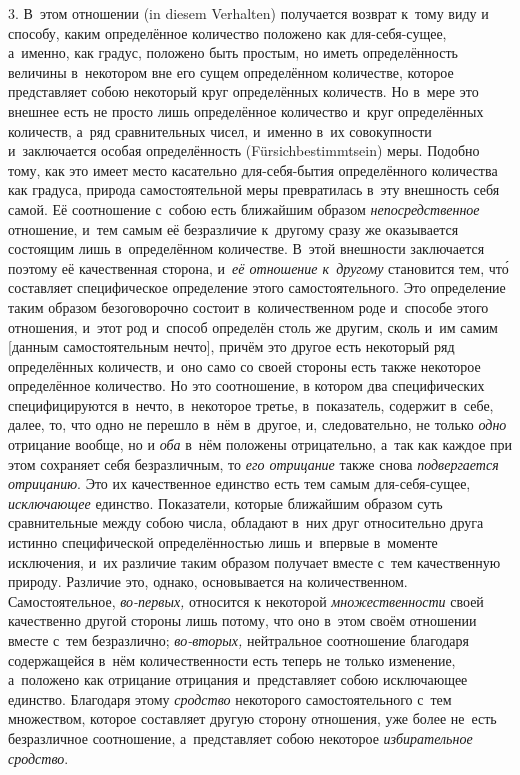3. В~этом отношении (in die\-sem Ver\-hal\-ten) получается возврат к~тому виду
и способу, каким определённое количество положено как для-себя-сущее, а~именно,
как градус, положено быть простым, но иметь определённость величины в~некотором
вне его сущем определённом количестве, которое представляет собою некоторый
круг определённых количеств. Но в~мере это внешнее есть не просто лишь
определённое количество и~круг определённых количеств, а~ряд сравнительных
чисел, и~именно в~их совокупности и~заключается особая определённость
(Für\-sich\-bes\-timmt\-sein) меры. Подобно тому, как это имеет место
касательно для-себя-бытия определённого количества как градуса, природа
самостоятельной меры превратилась в~эту внешность себя самой. Её соотношение
с~собою есть ближайшим образом {\em непосредственное} отношение, и~тем самым её
безразличие к~другому сразу же оказывается состоящим лишь в~определённом
количестве. В~этой внешности заключается поэтому её качественная сторона,
и~{\em её отношение к~другому} становится тем, чт\'{о} составляет специфическое
определение этого самостоятельного. Это определение таким образом безоговорочно
состоит в~количественном роде и~способе этого отношения, и~этот род и~способ
определён столь же другим, сколь и~им самим [данным самостоятельным нечто],
причём это другое есть некоторый ряд определённых количеств, и~оно само со
своей стороны есть также некоторое определённое количество. Но это соотношение,
в котором два специфических специфицируются в~нечто, в~некоторое третье,
в~показатель, содержит в~себе, далее, то, что одно не перешло в~нём в~другое,
и, следовательно, не только {\em одно} отрицание вообще, но и {\em оба} в~нём
положены отрицательно, а~так как каждое при этом сохраняет себя безразличным,
то {\em его отрицание} также снова {\em подвергается отрицанию}. Это их
качественное единство есть тем самым для-себя-сущее, {\em исключающее}
единство. Показатели, которые ближайшим образом суть сравнительные между собою
числа, обладают в~них друг относительно друга истинно специфической
определённостью лишь и~впервые в~моменте исключения, и~их различие таким
образом получает вместе с~тем качественную природу. Различие это, однако,
основывается на количественном. Самостоятельное, {\em во-первых,} относится к
некоторой {\em множественности} своей качественно другой стороны лишь потому,
что оно в~этом своём отношении вместе с~тем безразлично; {\em во-вторых,}
нейтральное соотношение благодаря содержащейся в~нём количественности есть
теперь не только изменение, а~положено как отрицание отрицания и~представляет
собою исключающее единство. Благодаря этому {\em сродство} некоторого
самостоятельного с~тем множеством, которое составляет другую сторону отношения,
уже более не~есть безразличное соотношение, а~представляет собою некоторое
{\em избирательное сродство}.


